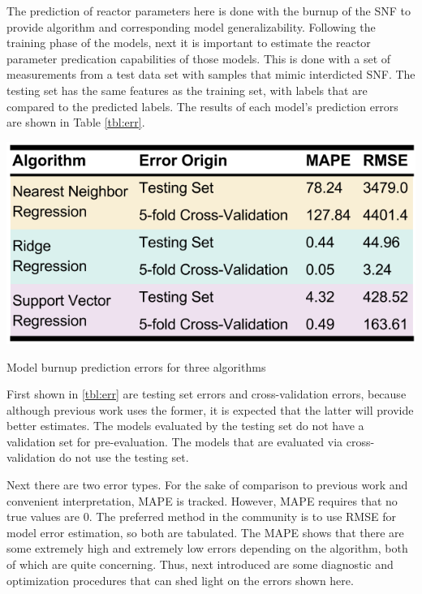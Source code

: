 The prediction of reactor parameters here is done with the burnup of the
\gls{SNF} to provide algorithm and corresponding model generalizability.
Following the training phase of the models, next it is important to estimate
the reactor parameter predication capabilities of those models. This is done
with a set of measurements from a test data set with samples that mimic
interdicted \gls{SNF}. The testing set has the same features as the training
set, with labels that are compared to the predicted labels. The results of each
model's prediction errors are shown in Table \ref{tbl:err}. 

\begin{table}[!htb]
  \centering
  \includegraphics[width=0.8\linewidth]{./chapters/demo_method/err.png}
  \caption{Model burnup prediction errors for three algorithms}
  \label{tbl:err}
\end{table}

First shown in \ref{tbl:err} are testing set errors and cross-validation
errors, because although previous work uses the former, it is expected that the
latter will provide better estimates.  The models evaluated by the testing set
do not have a validation set for pre-evaluation.  The models that are evaluated
via cross-validation do not use the testing set. 

Next there are two error types.  For the sake of comparison to previous work
and convenient interpretation, \gls{MAPE} is tracked. However, \gls{MAPE}
requires that no true values are $0$.  The preferred method in the community is
to use \gls{RMSE} for model error estimation, so both are tabulated.  The
\gls{MAPE} shows that there are some extremely high and extremely low errors
depending on the algorithm, both of which are quite concerning.  Thus, next
introduced are some diagnostic and optimization procedures that can shed light
on the errors shown here.

